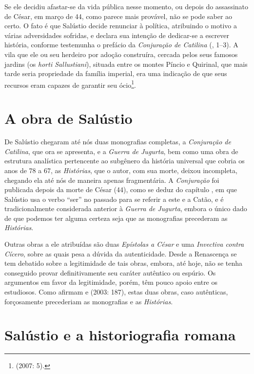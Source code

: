 Se ele decidiu afastar-se da vida pública nesse momento, ou depois do
assassinato de César, em março de 44, como parece mais provável, não se pode
saber ao certo. O fato é que Salústio decide renunciar à política, atribuindo o
motivo a várias adversidades sofridas, e declara sua intenção de dedicar-se a
escrever história, conforme testemunha o prefácio da \emph{Conjuração de
Catilina} (, 1--3). A vila que ele ou seu herdeiro por adoção construíra,
cercada pelos seus famosos jardins (os \emph{horti Sallustiani}), situada entre
os montes Píncio e Quirinal, que mais tarde seria propriedade da família
imperial, era uma indicação de que seus recursos eram capazes de garantir seu
ócio\footnote{  (2007: 5).}. 


\section{A obra de Salústio}

De Salústio chegaram até nós duas monografias completas, a \emph{Conjuração de
Catilina}, que ora se apresenta, e a \emph{Guerra de Jugurta}, bem como uma
obra de estrutura analística pertencente ao subgênero da história universal que
cobria os anos de 78 a 67, as \emph{Histórias}, que o autor, com sua
morte, deixou incompleta, chegando ela até nós de maneira apenas fragmentária.
A \emph{Conjuração} foi publicada depois da morte de César (44), como se
deduz do capítulo , em que Salústio usa o verbo “ser” no passado para se
referir a este e a Catão, e é tradicionalmente considerada anterior à
\emph{Guerra de Jugurta}, embora o único dado de que podemos ter alguma certeza
seja que as monografias precederam as \emph{Histórias}. 

Outras obras a ele atribuídas são duas \emph{Epístolas a César} e uma
\emph{Invectiva contra Cícero}, sobre as quais pesa a dúvida da autenticidade.
Desde a Renascença se tem debatido sobre a legitimidade de tais obras, embora,
até hoje, não se tenha conseguido provar definitivamente seu caráter autêntico
ou espúrio. Os argumentos em favor da legitimidade, porém, têm pouco apoio
entre os estudiosos. Como afirmam  e  (2003: 187), estas duas obras,
caso autênticas, forçosamente precederiam as monografias e as \emph{Histórias}. 

\section{Salústio e a historiografia romana}

